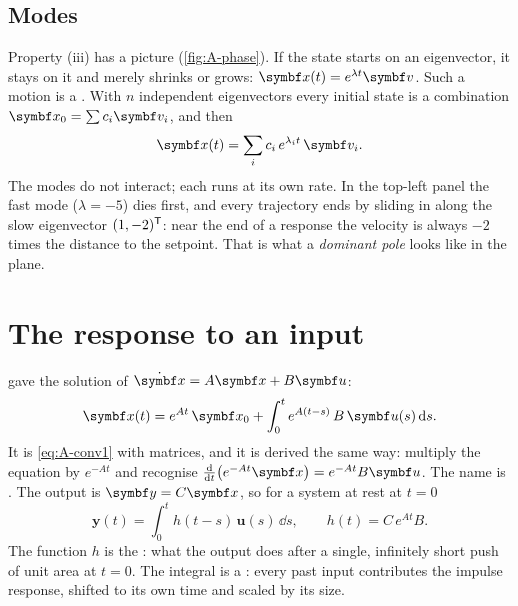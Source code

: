 \subsection{Modes}
Property (iii) has a picture (\cref{fig:A-phase}). If the state starts on an eigenvector, it stays on it and merely shrinks or grows: $\vx(t) = e^{\lambda t}\symbf v$. Such a motion is a . With $n$ independent eigenvectors every initial state is a combination $\vx_0 = \sum c_i\symbf v_i$, and then
\begin{equation}
  \vx(t) = \sum_i c_i\,e^{\lambda_i t}\,\symbf v_i .
\end{equation}
The modes do not interact; each runs at its own rate. In the top-left panel the fast mode ($\lambda = -5$) dies first, and every trajectory ends by sliding in along the slow eigenvector $(1, -2)^{\mathsf{T}}$: near the end of a response the velocity is always $-2$ times the distance to the setpoint. That is what a \emph{dominant pole} looks like in the plane.

\section{The response to an input}

 gave the solution of $\dot{\vx} = A\vx + B\symbf u$:
\begin{equation}\label{eq:A-voc}
  \vx(t) = e^{At}\,\vx_0 + \int_0^t e^{A(t - s)}\,B\,\symbf u(s)\,\dd s .
\end{equation}
It is \cref{eq:A-conv1} with matrices, and it is derived the same way: multiply the equation by $e^{-At}$ and recognise $\frac{\dd}{\dd t}\big(e^{-At}\vx\big) = e^{-At}B\symbf u$. The name is . The output is $\symbf y = C\vx$, so for a system at rest at $t = 0$
\begin{equation}\label{eq:A-conv}
  \symbf y(t) = \int_0^t h(t - s)\,\symbf u(s)\,\dd s, \qquad h(t) = C\,e^{At}B .
\end{equation}
The function $h$ is the : what the output does after a single, infinitely short push of unit area at $t = 0$. The integral is a : every past input contributes the impulse response, shifted to its own time and scaled by its size.

